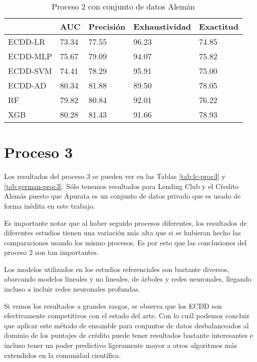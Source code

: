\begin{table}[]
\centering
\caption{Proceso 2 con conjunto de datos Alemán}
\label{tab:german-proc2}
\begin{tabularx}{0.75\textwidth}{|l|Y Y Y Y|}
				\hline
				& AUC	   & Precisión & Exhaustividad	& Exactitud  \\
				\hline
ECDD-LR		   & 73.34	 & 77.55	 & 96.23	 & 74.85	 \\
ECDD-MLP		  & 75.67	 & 79.09	 & 94.07	 & 75.82	 \\
ECDD-SVM		  & 74.41	 & 78.29	 & 95.91	 & 75.00	 \\
ECDD-AD		   & 80.34	 & 81.88	 & 89.50	 & 78.05	 \\
				\hline
RF			  & 79.82	 & 80.84	 & 92.01	 & 76.22	 \\
XGB			 & 80.28	 & 81.43	 & 91.66	 & 78.93	 \\
				\hline
\end{tabularx}
\end{table}


\section{Proceso 3} %

Los resultados del proceso 3 se pueden ver en las Tablas \ref{tab:lc-proc3} y \ref{tab:german-proc3}. Sólo tenemos resultados para Lending Club y el Cŕedito Alemás puesto que Apurata es un conjunto de datos privado que es usado de forma inédita en este trabajo.

Es importante notar que al haber seguido procesos diferentes, los resultados de diferentes estudios tienen una variación más alta que si se hubieran hecho las comparaciones usando los mismo procesos. Es por esto que las conclusiones del proceso 2 son tan importantes.

Los modelos utilizados en los estudios referenciales son bastante diversos, abarcando modelos lineales y no lineales, de árboles y redes neuronales, llegando incluso a incluir redes neuronales profundas.

Si vemos los resultados a grandes rasgos, se observa que los \ac{ECDD} son efectivamente competitivos con el estado del arte. Con lo cuál podemos concluir que aplicar este método de ensamble para conjuntos de datos desbalanceados al dominio de los puntajes de crédito puede tener resultados bastante interesantes e incluso tener un poder predictivo ligeramente mayor a otros algoritmos más extendidos en la comunidad científica.


